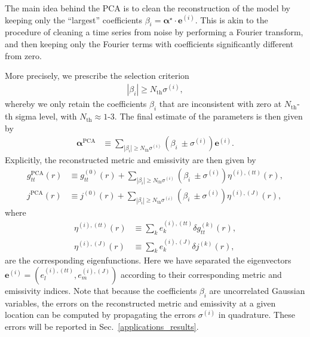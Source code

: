 \documentclass[%
nofootinbib,
 amsmath,amssymb,
 aps,
floatfix,
twocolumn
]{revtex4-2}
\begin{document}
The main idea behind the PCA is to
clean the reconstruction of the 
model by keeping only the ``largest'' coefficients 
\(\beta_i = \boldsymbol{\alpha}^\star \cdot \boldsymbol{e}^{(i)}\).
This is akin to the procedure of cleaning a time series from noise by performing a Fourier transform, and then keeping only the
Fourier terms with coefficients significantly different from zero.


More precisely, we prescribe the selection criterion \cite{Pieroni:2020rob}
%
\begin{align}
    \left \lvert \beta_i \right \rvert \geq N_\text{th} \sigma^{(i)},
\end{align}
%
whereby we only retain the coefficients \(\beta_i\) that are inconsistent with zero at \(N_\text{th}\)-th sigma level,
with $N_\text{th}\approx 1$-3. 
The final estimate of the parameters is then  given by
%
\begin{align}
    \boldsymbol{\alpha}^\text{PCA} & \equiv \sum_{\left \lvert \beta_i \right \rvert \geq N_\text{th} \sigma^{(i)}} \left(\beta_i\ \pm \sigma^{(i)}\right) \boldsymbol{e}^{(i)}.
\end{align}
%
%
Explicitly, the reconstructed metric and emissivity are then given by
%
\begin{align}
    g_{tt}^\text{PCA}(r)& \equiv g_{tt}^{(0)}(r) + \sum_{\left \lvert \beta_i \right \rvert \geq N_\text{th} \sigma^{(i)}} \left(\beta_i\ \pm \sigma^{(i)}\right)\eta^{(i),(tt)}(r) ,\\
        j^\text{PCA}(r)& \equiv j^{(0)}(r) + \sum_{\left \lvert \beta_i \right \rvert \geq N_\text{th} \sigma^{(i)}} \left(\beta_i\ \pm \sigma^{(i)}\right)\eta^{(i),(J)}(r),
\end{align}
%
where
%
\begin{align}
    \eta^{(i),(tt)}(r) &\equiv \sum_{k} e^{(i),(tt)}_k \delta g_{tt}^{(k)} (r),\\
    \eta^{(i),(J)}(r) &\equiv \sum_{k} e^{(i),(J)}_k \delta j^{(k)} (r) ,
\end{align}
%
are the corresponding eigenfunctions. Here we have separated the eigenvectors \( \boldsymbol{e}^{(i)} = \left(e^{(i),(tt)}_l, e^{(i),(J)}_m\right) \) according to their corresponding metric and emissivity indices.
%
Note that because the coefficients
$\beta_i$ are uncorrelated Gaussian variables, the errors on the reconstructed metric and emissivity at  a given location can be computed by propagating the errors $\sigma^{(i)}$ in quadrature. These errors will be reported in Sec.~\ref{applications_results}.
\end{document}
